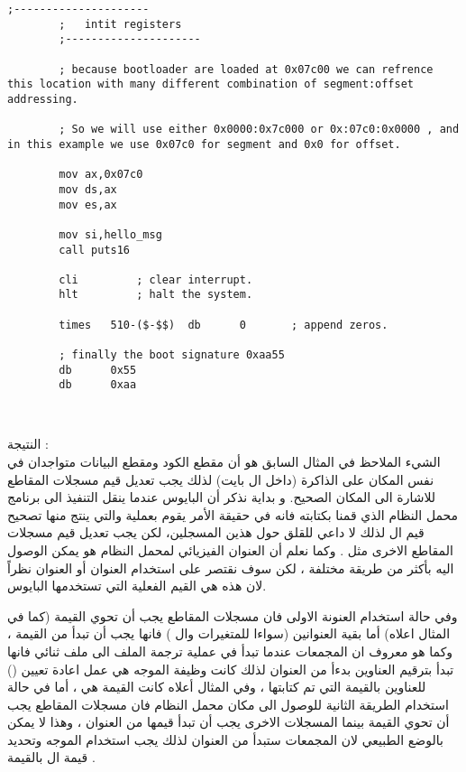 \documentclass[document.tex]{subfiles}
\begin{document}
\begin{english}
\begin{lstlisting}[label=lst:hello_bootloader,caption=\en{Welcom to OS World}]
		;---------------------
		;	intit registers
		;---------------------
		
		; because bootloader are loaded at 0x07c00 we can refrence this location with many different combination of segment:offset addressing.
		
		; So we will use either 0x0000:0x7c000 or 0x:07c0:0x0000 , and in this example we use 0x07c0 for segment and 0x0 for offset.
		
		mov ax,0x07c0			
		mov ds,ax
		mov es,ax
		
		mov si,hello_msg
		call puts16

		cli			; clear interrupt.		
		hlt			; halt the system.
		
		times	510-($-$$)	db		0		; append zeros.
		
		; finally the boot signature 0xaa55
		db		0x55
		db		0xaa
		
		
\end{lstlisting}
\end{english}


النتيجة :\\

الشيء الملاحظ في المثال السابق هو أن مقطع الكود  ومقطع البيانات  متواجدان في نفس المكان على الذاكرة (داخل ال  بايت) لذلك يجب تعديل قيم مسجلات المقاطع للاشارة الى المكان الصحيح.
و بداية نذكر أن البايوس عندما ينقل التنفيذ الى برنامج محمل النظام الذي قمنا بكتابته فانه في حقيقة الأمر يقوم بعملية  والتي ينتج منها تصحيح قيم ال  لذلك لا داعي للقلق حول هذين المسجلين، لكن يجب تعديل قيم مسجلات المقاطع الاخرى مثل . وكما نعلم أن العنوان الفيزيائي لمحمل النظام هو  يمكن الوصول اليه بأكثر من  طريقة مختلفة ، لكن سوف نقتصر على استخدام العنوان  أو العنوان  نظراً لان هذه هي القيم الفعلية التي تستخدمها البايوس.

وفي حالة استخدام العنونة الاولى فان مسجلات المقاطع يجب أن تحوي القيمة  (كما في المثال اعلاه) أما بقية العنوانين (سواءا للمتغيرات وال ) فانها يجب أن تبدأ من القيمة ، وكما هو معروف ان المجمعات عندما تبدأ في عملية ترجمة الملف الى ملف ثنائي فانها تبدأ بترقيم العناوين بدءأ من العنوان  لذلك كانت وظيفة الموجه  هي عمل اعادة تعيين () للعناوين بالقيمة التي تم كتابتها ، وفي المثال أعلاه كانت القيمة هي  ، أما في حالة استخدام الطريقة الثانية للوصول الى مكان محمل النظام فان مسجلات المقاطع يجب أن تحوي القيمة  بينما المسجلات الاخرى يجب أن تبدأ قيمها من العنوان  ، وهذا لا يمكن بالوضع الطبيعي لان المجمعات ستبدأ من العنوان  لذلك يجب استخدام الموجه  وتحديد قيمة ال  بالقيمة  .
\end{document}
